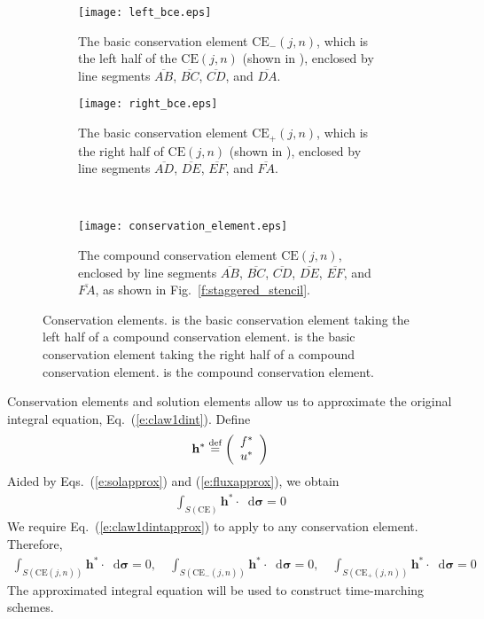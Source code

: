 \documentclass[a4paper,12pt,dvips]{article}
\newcommand*\diff{\mathop{}\!\mathrm{d}}
\newcommand*\defeq{\buildrel{\text{def}}\over{=}}
\begin{document}
\begin{figure}[htbp]
\centering
%
\begin{subfigure}{0.45\textwidth}
\centering
\texttt{[image: left\_bce.eps]}
\caption{The basic conservation element $\mathrm{CE}_-(j,n)$, which is the left
half of the $\mathrm{CE}(j,n)$ (shown in ), enclosed by line
segments $\overline{AB}$, $\overline{BC}$, $\overline{CD}$, and
$\overline{DA}$.}
\label{f:left_bce}
\end{subfigure}
\textwidth
%
\begin{subfigure}{0.45\textwidth}
\centering
\texttt{[image: right\_bce.eps]}
\caption{The basic conservation element $\mathrm{CE}_+(j,n)$, which is the
right half of $\mathrm{CE}(j,n)$ (shown in ), enclosed by line
segments $\overline{AD}$, $\overline{DE}$, $\overline{EF}$, and
$\overline{FA}$.}
\label{f:right_bce}
\end{subfigure}
\\
%
\begin{subfigure}{0.45\textwidth}
\centering
\texttt{[image: conservation\_element.eps]}
\caption{The compound conservation element $\mathrm{CE}(j,n)$, enclosed by line
segments $\overline{AB}$, $\overline{BC}$, $\overline{CD}$, $\overline{DE}$,
$\overline{EF}$, and $\overline{FA}$, as shown in
Fig.~\ref{f:staggered_stencil}.}
\label{f:cce}
\end{subfigure}
%
\caption{Conservation elements.   is the basic conservation
element taking the left half of a compound conservation element.
 is the basic conservation element taking the right half of
a compound conservation element.   is the compound conservation
element.}
\label{f:conservation_element}
\end{figure}

Conservation elements and solution elements allow us to approximate the
original integral equation, Eq.~(\ref{e:claw1dint}).  Define
\begin{align*}
  \mathbf{h}^* \defeq \left(\begin{array}{c}
    f^* \\ u^*
  \end{array}\right)
\end{align*}
Aided by Eqs.~(\ref{e:solapprox}) and (\ref{e:fluxapprox}), we obtain
\begin{align}
  \int_{S(\mathrm{CE})} \mathbf{h}^*\cdot\diff\boldsymbol{\sigma} = 0
  \label{e:claw1dintapprox}
\end{align}
We require Eq.~(\ref{e:claw1dintapprox}) to apply to any conservation element.
Therefore,
\begin{align*}
  \int_{S(\mathrm{CE}(j,n))} \mathbf{h}^*\cdot\diff\boldsymbol{\sigma} = 0,
  \quad
  \int_{S(\mathrm{CE}_-(j,n))} \mathbf{h}^*\cdot\diff\boldsymbol{\sigma} = 0,
  \quad
  \int_{S(\mathrm{CE}_+(j,n))} \mathbf{h}^*\cdot\diff\boldsymbol{\sigma} = 0
\end{align*}
The approximated integral equation will be used to construct time-marching
schemes.
\end{document}
